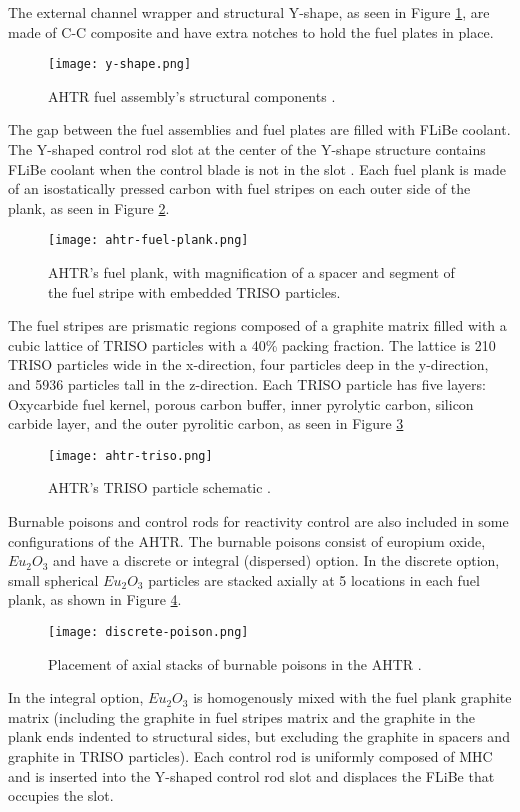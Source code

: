 The external channel wrapper and structural Y-shape, as seen in Figure 
\ref{fig:y-shape}, are made of C-C composite and have extra notches to hold 
the fuel plates in place.
\begin{figure}[]
    \centering
    \texttt{[image: y-shape.png]} 
    \caption{\acrlong{AHTR} fuel assembly's structural components 
    \cite{noauthor_fluoride_nodate}.}
    \label{fig:y-shape}
\end{figure}
The gap between the fuel assemblies and fuel plates are filled with \gls{FLiBe}
coolant. 
The Y-shaped control rod slot at the center of the Y-shape structure contains 
\gls{FLiBe} coolant when the control blade is not in the slot
\cite{varma_ahtr_2012,ramey_monte_2018,noauthor_fluoride_nodate}.
Each fuel plank is made of an isostatically pressed carbon with fuel stripes 
on each outer side of the plank, as seen in Figure \ref{fig:ahtr-fuel-plank}. 
\begin{figure}[]
    \centering
    \texttt{[image: ahtr-fuel-plank.png]} 
    \caption{\acrlong{AHTR}'s fuel plank, with magnification of 
    a spacer and segment of the fuel stripe with embedded TRISO particles.}
    \label{fig:ahtr-fuel-plank}
\end{figure}
The fuel stripes are prismatic regions composed of a graphite matrix filled with 
a cubic lattice of \gls{TRISO} particles with a 40\% packing fraction. 
The lattice is 210 \gls{TRISO} particles wide in the x-direction, four particles 
deep in the y-direction, and 5936 particles tall in the z-direction. 
Each \gls{TRISO} particle has five layers: Oxycarbide fuel kernel, porous carbon 
buffer, inner pyrolytic carbon, silicon carbide layer, and the outer pyrolitic 
carbon, as seen in Figure \ref{fig:ahtr-triso}
\begin{figure}[]
    \centering
    \texttt{[image: ahtr-triso.png]} 
    \caption{\acrlong{AHTR}'s TRISO particle schematic \cite{noauthor_fluoride_nodate}.}
    \label{fig:ahtr-triso}
\end{figure}

Burnable poisons and control rods for reactivity control are also included in 
some configurations of the \gls{AHTR}. 
The burnable poisons consist of europium oxide, $Eu_2O_3$ and have a discrete
or integral (dispersed) option. 
In the discrete option, small spherical $Eu_2O_3$ particles are stacked axially 
at 5 locations in each fuel plank, as shown in Figure \ref{fig:discrete-poison}. 
\begin{figure}[]
    \centering
    \texttt{[image: discrete-poison.png]} 
    \caption{Placement of axial stacks of burnable poisons in the \acrlong{AHTR} 
    \cite{noauthor_fluoride_nodate}.}
    \label{fig:discrete-poison}
\end{figure}
In the integral option, $Eu_2O_3$ is homogenously mixed with the fuel plank 
graphite matrix (including the graphite in fuel stripes matrix and the 
graphite in the plank ends indented to structural sides, but excluding the 
graphite in spacers and graphite in TRISO particles). 
Each control rod is uniformly composed of \gls{MHC} and is inserted into the 
Y-shaped control rod slot and displaces the \gls{FLiBe} that occupies the slot. 

